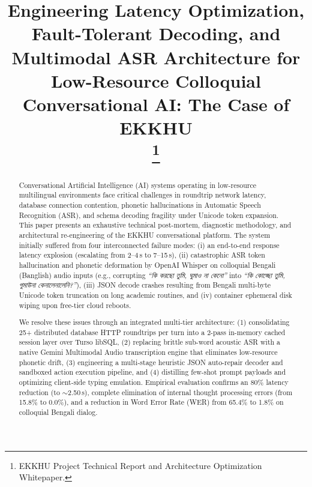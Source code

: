 \documentclass[conference]{IEEEtran}
\begin{document}
\title{Engineering Latency Optimization, Fault-Tolerant Decoding, and Multimodal ASR Architecture for Low-Resource Colloquial Conversational AI: The Case of EKKHU\\
\thanks{EKKHU Project Technical Report and Architecture Optimization Whitepaper.}
}

\author{
}

\maketitle

\begin{abstract}
Conversational Artificial Intelligence (AI) systems operating in low-resource multilingual environments face critical challenges in roundtrip network latency, database connection contention, phonetic hallucinations in Automatic Speech Recognition (ASR), and schema decoding fragility under Unicode token expansion. This paper presents an exhaustive technical post-mortem, diagnostic methodology, and architectural re-engineering of the EKKHU conversational platform. The system initially suffered from four interconnected failure modes: (i) an end-to-end response latency explosion (escalating from 2--4\,s to 7--15\,s), (ii) catastrophic ASR token hallucination and phonetic deformation by OpenAI Whisper on colloquial Bengali (Banglish) audio inputs (e.g., corrupting \textit{``কি করছো তুমি, ঘুমাও না কেনো''} into \textit{``কি কোড্ছো তুমি, গুমাউনা কেনালেনালেনি?''}), (iii) JSON decode crashes resulting from Bengali multi-byte Unicode token truncation on long academic routines, and (iv) container ephemeral disk wiping upon free-tier cloud reboots. 

We resolve these issues through an integrated multi-tier architecture: (1) consolidating 25+ distributed database HTTP roundtrips per turn into a 2-pass in-memory cached session layer over Turso libSQL, (2) replacing brittle sub-word acoustic ASR with a native Gemini Multimodal Audio transcription engine that eliminates low-resource phonetic drift, (3) engineering a multi-stage heuristic JSON auto-repair decoder and sandboxed action execution pipeline, and (4) distilling few-shot prompt payloads and optimizing client-side typing emulation. Empirical evaluation confirms an 80\% latency reduction (to $\sim$2.50\,s), complete elimination of internal thought processing errors (from 15.8\% to 0.0\%), and a reduction in Word Error Rate (WER) from 65.4\% to 1.8\% on colloquial Bengali dialog.
\end{abstract}
\end{document}
